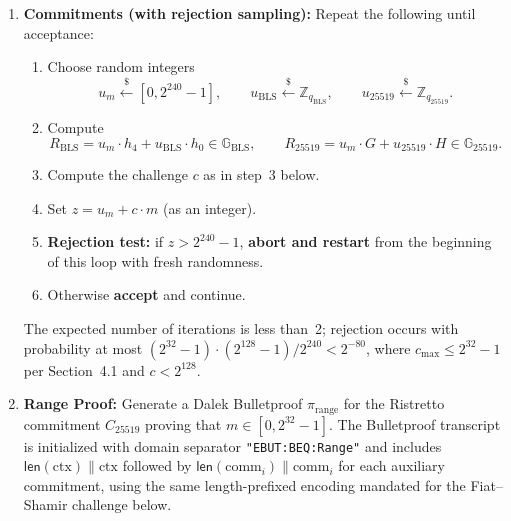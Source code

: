 \documentclass[11pt]{article}
\theoremstyle{definitionstyle}
\theoremstyle{plain}
\begin{document}
\begin{enumerate}[leftmargin=*]
\item \textbf{Commitments (with rejection sampling):}
  Repeat the following until acceptance:
  \begin{enumerate}
  \item Choose random integers
    \[
    u_m \xleftarrow{\$} [0, 2^{240}-1], \qquad
    u_{\text{BLS}} \xleftarrow{\$} \mathbb{Z}_{q_{\text{BLS}}}, \qquad
    u_{25519} \xleftarrow{\$} \mathbb{Z}_{q_{25519}}.
    \]
  \item Compute
    \[
    R_{\text{BLS}} = u_m \cdot h_4 + u_{\text{BLS}} \cdot h_0 \in \mathbb{G}_{\text{BLS}}, \qquad
    R_{25519} = u_m \cdot G + u_{25519} \cdot H \in \mathbb{G}_{25519}.
    \]
  \item Compute the challenge $c$ as in step~3 below.
  \item Set $z = u_m + c \cdot m$ (as an integer).
  \item \textbf{Rejection test:} if $z > 2^{240}-1$, \textbf{abort and restart} from the beginning of this loop with fresh randomness.
  \item Otherwise \textbf{accept} and continue.
  \end{enumerate}
  The expected number of iterations is less than~2; rejection occurs with probability at most $(2^{32}-1) \cdot (2^{128}-1) / 2^{240} < 2^{-80}$, where $c_{\max} \le 2^{32}-1$ per Section~4.1 and $c < 2^{128}$.

\item \textbf{Range Proof:}
  Generate a Dalek Bulletproof $\pi_{\text{range}}$ for the Ristretto commitment $C_{25519}$ proving that $m \in [0, 2^{32}-1]$. The Bulletproof transcript is initialized with domain separator \texttt{"EBUT:BEQ:Range"} and includes $\mathsf{len}(\text{ctx}) \parallel \text{ctx}$ followed by $\mathsf{len}(\text{comm}_i) \parallel \text{comm}_i$ for each auxiliary commitment, using the same length-prefixed encoding mandated for the Fiat--Shamir challenge below.


\end{enumerate}
\end{document}
